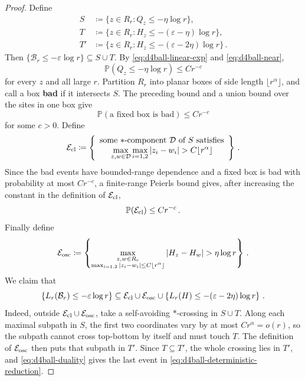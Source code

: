 \documentclass[11pt]{amsart}
\theoremstyle{plain}
\theoremstyle{definition}
\renewcommand{\P}{\mathbb{P}}
\begin{document}
\begin{proof}
	Define
	\[
	\begin{aligned}
		S&\coloneqq\{z\in R_r:Q_z\leq-\eta\log r\},\\
		T&\coloneqq\{z\in R_r:H_z\leq-(\varepsilon-\eta)\log r\},\\
		T'&\coloneqq\{z\in R_r:H_z\leq-(\varepsilon-2\eta)\log r\}\, .
	\end{aligned}
	\]
	Then $\{\mathcal B_r\leq-\varepsilon\log r\}\subseteq S\cup T$. By
	\eqref{eq:d4ball-linear-exp} and \eqref{eq:d4ball-near},
	\[
	    \P(Q_z\leq-\eta\log r)
	    \leq Cr^{-c}
	\]
	for every $z$ and all large $r$.
	Partition $R_r$ into planar boxes of side length $\lfloor r^\alpha\rfloor$,
	and call a box \textbf{bad} if it intersects $S$. The preceding bound and a union
	bound over the sites in one box give
	\[
		\P(\text{a fixed box is bad})\leq Cr^{-c}
	\]
		for some $c>0$. Define
		\[
			\mathcal E_{\rm cl}\coloneqq
			\left\{
			\begin{array}{c}
			\text{some $\ast$-component $\mathcal D$ of $S$ satisfies}\\
			\displaystyle
			\max_{z,w\in \mathcal D}\max_{i=1,2}|z_i-w_i|
			> C\lfloor r^\alpha\rfloor
			\end{array}
			\right\}\, .
		\]
		Since the bad events have bounded-range dependence and a fixed box is
		bad with probability at most $Cr^{-c}$, a finite-range Peierls bound
		gives, after increasing the constant in the definition of
		$\mathcal E_{\rm cl}$,
		\begin{equation}\label{eq:d4ball-local-cluster}
		    \P(\mathcal E_{\rm cl})\leq Cr^{-c}\, .
		\end{equation}
		Finally define
		\begin{equation}\label{eq:d4ball-osc-event}
		    \mathcal E_{\rm osc}\coloneqq
		    \left\{
		    \max_{\substack{z,w\in R_r\\
		    \max_{i=1,2}|z_i-w_i|\leq C\lfloor r^\alpha\rfloor}}
		    |H_z-H_w|>\eta\log r
		    \right\}\, .
		\end{equation}
	We claim that
	\begin{equation}\label{eq:d4ball-deterministic-reduction}
	    \{L_r(\mathcal B_r)\leq-\varepsilon\log r\}
	    \subseteq
	    \mathcal E_{\rm cl}\cup\mathcal E_{\rm osc}\cup
	    \left\{L_r(H)\leq-(\varepsilon-2\eta)\log r\right\}\, .
	\end{equation}
		Indeed, outside $\mathcal E_{\rm cl}\cup\mathcal E_{\rm osc}$, take a
		self-avoiding $\ast$-crossing in $S\cup T$. Along each maximal subpath in
		$S$, the first two coordinates vary by at most $Cr^\alpha=o(r)$, so the
		subpath cannot cross top-bottom by itself and must touch $T$. The definition
		of $\mathcal E_{\rm osc}$ then puts that subpath in $T'$. Since
	$T\subseteq T'$, the whole crossing lies in $T'$, and
	\eqref{eq:d4ball-duality} gives the last event in
	\eqref{eq:d4ball-deterministic-reduction}.


\end{proof}
\end{document}

